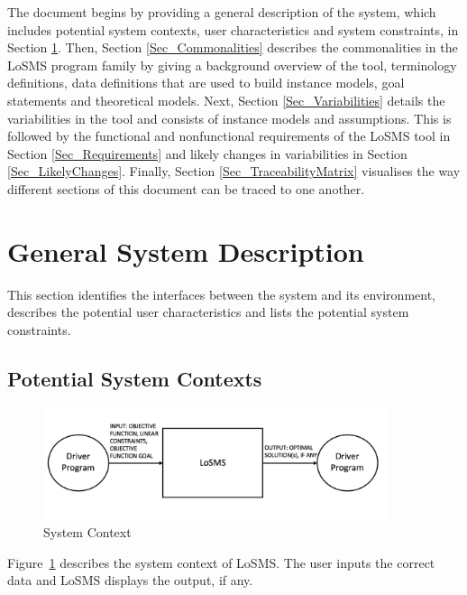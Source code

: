 \documentclass[12pt]{article}
\newcommand{\famname}{LoSMS} %
\begin{document}
The document begins by providing a general description of the system, which 
includes potential system contexts, user characteristics and system 
constraints, in Section \ref{SecSystemDescription}. Then, Section 
\ref{Sec_Commonalities} describes the commonalities in the \famname{} program 
family by giving a background overview of the tool, terminology definitions, 
data definitions that are used to build instance models, goal statements and 
theoretical models. Next, Section \ref{Sec_Variabilities} details the 
variabilities in the tool and consists of instance models and assumptions. This 
is followed by the functional and nonfunctional requirements of the \famname{} 
tool in Section \ref{Sec_Requirements} and likely changes in variabilities in 
Section \ref{Sec_LikelyChanges}. Finally, Section \ref{Sec_TraceabilityMatrix} 
visualises the way different sections of this document can be traced to one 
another. \\

\section{General System Description} \label{SecSystemDescription}

This section identifies the interfaces between the system and its environment,
describes the potential user characteristics and lists the potential system
constraints.

\subsection{Potential System Contexts}

\begin{figure}[h!]
	\begin{center}
		\includegraphics[width=0.9\textwidth, 
		height=0.20\textheight]{system-context}
		\caption{System Context}
		\label{Figure_SystemContext} 
	\end{center}
\end{figure}

Figure~\ref{Figure_SystemContext} describes the system context of \famname{}. 
The user inputs the correct data and \famname{} displays the output, if any.
\end{document}
